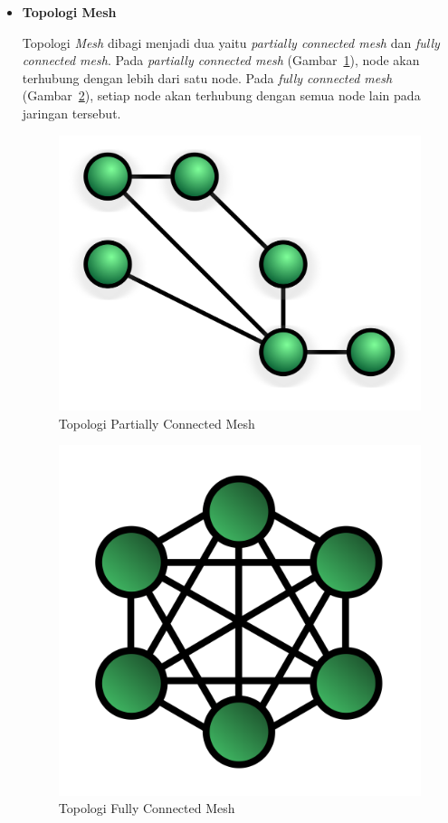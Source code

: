 \documentclass[a4paper,twoside]{article}
\begin{document}
\begin{enumerate}
\begin{itemize}
\item \textbf{Topologi Mesh}

Topologi \textit{Mesh} dibagi menjadi dua yaitu \textit{partially connected mesh} dan \textit{fully connected mesh}. Pada \textit{partially connected mesh} (Gambar~\ref{fig:mesh_partial}), node akan terhubung dengan lebih dari satu node. Pada \textit{fully connected mesh} (Gambar~\ref{fig:mesh_fully}), setiap node akan terhubung dengan semua node lain pada jaringan tersebut.
\begin{figure} [H]
	\centering  
	\includegraphics[scale=0.07]{Gambar/mesh_partial}  
	\caption[Topologi Partially Connected Mesh]{Topologi Partially Connected Mesh} 
	\label{fig:mesh_partial} 
\end{figure} 
\begin{figure} [H]
	\centering  
	\includegraphics[scale=0.07]{Gambar/mesh_fully}  
	\caption[Topologi Fully Connected Mesh]{Topologi Fully Connected Mesh} 
	\label{fig:mesh_fully} 
\end{figure}


\end{itemize}
\end{enumerate}
\end{document}
